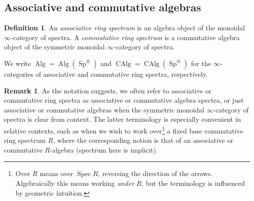 \documentclass{article}
\theoremstyle{definition}
\newtheorem{definition}{Definition}[subsection]
\newtheorem{remark}{Remark}[subsection]
\renewcommand{\i}{\infty}
\DeclareMathOperator{\Alg}{Alg}
\DeclareMathOperator{\CAlg}{CAlg}
\DeclareMathOperator{\Spec}{Spec}
\DeclareMathOperator{\Sp}{Sp}
\begin{document}
\subsection{Associative and commutative algebras}

\begin{definition}
An {\em associative ring spectrum} is an algebra object of the monoidal $\i$-category of spectra.
A {\em commutative ring spectrum} is a commutative algebra object of the symmetric monoidal $\i$-category of spectra.
\end{definition}


We write $\Alg=\Alg(\Sp^\otimes)$ and $\CAlg=\CAlg(\Sp^\otimes)$ for the $\infty$-categories of associative and commutative ring spectra, respectively.

\begin{remark}
As the notation suggests, we often refer to associative or commutative ring spectra as associative or commutative algebra spectra, or just associative or commutative algebras when the symmetric monoidal $\i$-category of spectra is clear from context.
The latter terminology is especially convenient in relative contexts, such as when we wish to work over\footnote{Over $R$ means over $\Spec R$, reversing the direction of the arrows. Algebraically this means working {\em under} $R$, but the terminology is influenced by geometric intuition.} a fixed base commutative ring spectrum $R$, where the corresponding notion is that of an associative or commutative $R$-algebra (spectrum here is implicit).
\end{remark}
\end{document}
